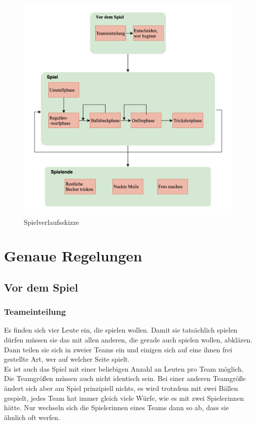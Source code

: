 \documentclass[a5paper, 12pt]{book}
\begin{document}
\begin{figure} 
    \centering
    \hspace*{-1.5cm}\includegraphics[scale = 0.27]{Bierpongflowneu.png}
    \caption{Spielverlaufsskizze}
    \label{fig:bierpongflow}
\end{figure}

\section{Genaue Regelungen}\label{sec:genaue regelungen}
\subsection{Vor dem Spiel}\label{sub:vor dem spiel}
\subsubsection{Teameinteilung}\label{subsubsec:teameinteilung}
Es finden sich vier Leute ein, die spielen wollen. Damit sie tatsächlich spielen dürfen müssen sie das mit allen anderen, die gerade auch spielen wollen, abklären. Dann teilen sie sich in zweier Teams ein und einigen sich auf eine ihnen frei gestellte Art, wer auf welcher Seite spielt. \\
Es ist auch das Spiel mit einer beliebigen Anzahl an Leuten pro Team möglich. Die Teamgrößen müssen auch nicht identisch sein. Bei einer anderen Teamgröße ändert sich aber am Spiel prinzipiell nichts, es wird trotzdem mit zwei Bällen gespielt, jedes Team hat immer gleich viele Würfe, wie es mit zwei Spielerinnen hätte. Nur wechseln sich die Spielerinnen eines Teams dann so ab, dass sie ähnlich oft werfen.
\end{document}
